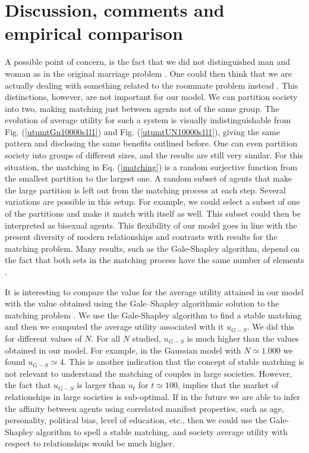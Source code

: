 \documentclass[12pt]{article}
\begin{document}
\section{Discussion, comments and empirical comparison}
\label{discussionandcomments}

A possible point of concern, is the fact that we did not distinguished man and woman as in the original marriage problem \cite{10.2307/2312726}. One could then think that we are actually dealing with something related to the roommate problem instead \cite{10.2307/2312726}. This distinctions, however, are not important for our model. We can partition society into two, making matching just between agents not of the same group. The evolution of average utility for such a system is visually indistinguishable from Fig. (\ref{utumtGn10000s1l1}) and Fig. (\ref{utumtUN10000s1l1}), giving the same pattern and disclosing the same benefits outlined before. One can even partition society into groups of different sizes, and the results are still very similar. For this situation, the matching in Eq. (\ref{matching}) is a random surjective function from the smallest partition to the largest one. A random subset of agents that make the large partition is left out from the matching process at each step. Several variations are possible in this setup. For example, we could select a subset of one of the partitions and make it match with itself as well. This subset could then be interpreted as bisexual agents. This flexibility of our model goes in line with the present diversity of modern relationships and contrasts with results for the matching problem. Many results, such as the Gale-Shapley algorithm, depend on the fact that both sets in the matching process have the same number of elements \cite{roth1992two}.

It is interesting to compare the value for the average utility attained in our model with the value obtained using the Gale–Shapley algorithmic solution to the matching problem \cite{10.2307/2312726}. We use the Gale-Shapley algorithm to find a stable matching and then we computed the average utility associated with it $u_{G-S}$. We did this for different values of $N$. For all $N$ studied, $u_{G-S}$ is much higher than the values obtained in our model. For example, in the Gaussian model with $N\simeq 1.000$ we found $u_{G-S}\simeq 4$. This is another indication that the concept of stable matching is not relevant to understand the matching of couples in large societies. However, the fact that $u_{G-S}$ is larger than $u_t$ for $t\simeq100$, implies that the market of relationships in large societies is sub-optimal. If in the future we are able to infer the affinity between agents using correlated manifest properties, such as age, personality, political bias, level of education, etc., then we could use the Gale-Shapley algorithm to spell a stable matching, and society average utility with respect to relationships would be much higher. 
\end{document}
